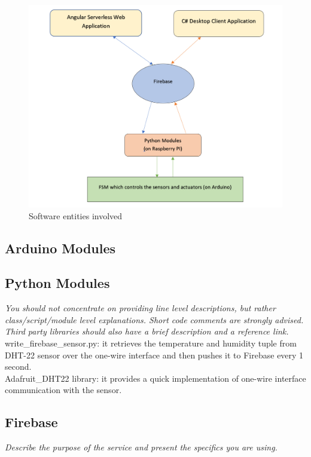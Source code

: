 \documentclass[a4paper,11pt]{article}
\begin{document}
\begin{figure}[h]
\centering
\includegraphics[scale=0.9]{SWArchitecture.png}
\caption{Software entities involved}
\label{fig:soft-design}
\end{figure}

\subsection{Arduino Modules}

\subsection{Python Modules}
\textit{You should not concentrate on providing line level descriptions, but rather class/script/module level explanations. Short code comments are strongly advised. Third party libraries should also have a brief description and a reference link.}\\

write\_firebase\_sensor.py: it retrieves the temperature and humidity tuple from DHT-22 sensor over the one-wire interface and then pushes it to Firebase every 1 second. \\

Adafruit\_DHT22 library: it provides a quick implementation of one-wire interface communication with the sensor.

\subsection{Firebase}
\textit{Describe the purpose of the service and present the specifics you are using.}\\
\end{document}
